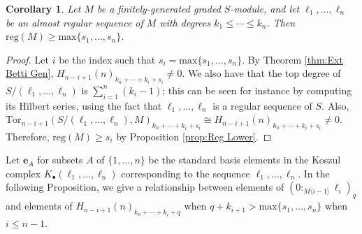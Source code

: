 \documentclass[a4paper, 10pt, reqno, english, ones]{amsart}  %
\newtheorem{corollary}[theorem]{Corollary}
\theoremstyle{definition}
\theoremstyle{remark}
\begin{document}
\begin{corollary}\label{cor:Reg Lower}
    Let $M$ be a finitely-generated graded $S$-module, and let $\ell_1,\dots,\ell_n$ be an almost regular sequence of $M$ with degrees $k_1\leq \cdots \leq k_n$. Then $\textrm{reg}(M) \geq \textrm{max}\{s_1,\dots,s_n\}$.
\end{corollary}
\begin{proof}
Let $i$ be the index such that $s_i=\textrm{max}\{s_1,\dots,s_n\}$. By Theorem \ref{thm:Ext Betti Gen}, $H_{n-i+1}(n)_{k_n+\cdots +k_i +s_i}\neq 0$. We also have that the top degree of $S/(\ell_1,\dots,\ell_n)$ is $\sum_{i=1}^n(k_i-1)$; this can be seen for instance by computing its Hilbert series, using the fact that $\ell_1,\dots,\ell_n$ is a regular sequence of $S$. Also, $\textrm{Tor}_{n-i+1}(S/(\ell_1,\dots,\ell_n),M)_{k_n+\cdots +k_i +s_i} \cong H_{n-i+1}(n)_{k_n+\cdots +k_i +s_i}\neq 0$. Therefore, $\textrm{reg}(M)\geq s_i$ by Proposition \ref{prop:Reg Lower}.
\end{proof}

 Let $\textbf{e}_A$ for subsets $A$ of $\{1,\dots,n\}$ be the standard basis elements in the Koszul complex $K_{\bullet}(\ell_1,\dots,\ell_n)$ corresponding to the sequence $\ell_1,\dots,\ell_n$. In the following Proposition, we give a relationship between elements of $(0:_{M\langle i-1\rangle} \ell_{i})_{q}$ and elements of $H_{n-i+1}(n)_{k_n+\cdots+k_i+q}$ when $q +k_{i+1} > \textrm{max}\{s_1,\dots,s_{n}\}$ when $i\leq n-1$.
\end{document}
